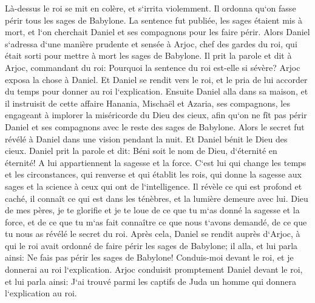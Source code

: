 \verse Là-dessus le roi se mit en colère, et s`irrita violemment. Il ordonna qu`on fasse périr tous les sages de Babylone. 
\verse La sentence fut publiée, les sages étaient mis à mort, et l`on cherchait Daniel et ses compagnons pour les faire périr. 
\verse Alors Daniel s`adressa d`une manière prudente et sensée à Arjoc, chef des gardes du roi, qui était sorti pour mettre à mort les sages de Babylone. 
\verse Il prit la parole et dit à Arjoc, commandant du roi: Pourquoi la sentence du roi est-elle si sévère? Arjoc exposa la chose à Daniel. 
\verse Et Daniel se rendit vers le roi, et le pria de lui accorder du temps pour donner au roi l`explication. 
\verse Ensuite Daniel alla dans sa maison, et il instruisit de cette affaire Hanania, Mischaël et Azaria, ses compagnons, 
\verse les engageant à implorer la miséricorde du Dieu des cieux, afin qu`on ne fît pas périr Daniel et ses compagnons avec le reste des sages de Babylone. 
\verse Alors le secret fut révélé à Daniel dans une vision pendant la nuit. Et Daniel bénit le Dieu des cieux. 
\verse Daniel prit la parole et dit: Béni soit le nom de Dieu, d`éternité en éternité! A lui appartiennent la sagesse et la force. 
\verse C`est lui qui change les temps et les circonstances, qui renverse et qui établit les rois, qui donne la sagesse aux sages et la science à ceux qui ont de l`intelligence. 
\verse Il révèle ce qui est profond et caché, il connaît ce qui est dans les ténèbres, et la lumière demeure avec lui. 
\verse Dieu de mes pères, je te glorifie et je te loue de ce que tu m`as donné la sagesse et la force, et de ce que tu m`as fait connaître ce que nous t`avons demandé, de ce que tu nous as révélé le secret du roi. 
\verse Après cela, Daniel se rendit auprès d`Arjoc, à qui le roi avait ordonné de faire périr les sages de Babylone; il alla, et lui parla ainsi: Ne fais pas périr les sages de Babylone! Conduis-moi devant le roi, et je donnerai au roi l`explication. 
\verse Arjoc conduisit promptement Daniel devant le roi, et lui parla ainsi: J`ai trouvé parmi les captifs de Juda un homme qui donnera l`explication au roi. 
